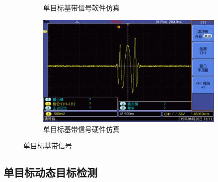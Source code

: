 \documentclass{article}
\newcounter{sub}
\begin{document}
\begin{figure}[H]
\begin{subfigure}[H]{.45\linewidth}
		\caption{单目标基带信号软件仿真}
		\label{fig:单目标基带信号软件仿真}
	\end{subfigure}
	\quad
	\begin{subfigure}[H]{.45\linewidth}
		\centering
		\includegraphics[width=\linewidth]{one-baseband-hardware.png}
		\caption{单目标基带信号硬件仿真}
		\label{fig:单目标基带信号硬件仿真}
	\end{subfigure}
	\caption{单目标基带信号}
	\label{fig:单目标基带信号}
\end{figure}

\subsection{单目标动态目标检测}%
\label{sub:单目标动态目标检测}
\end{document}
